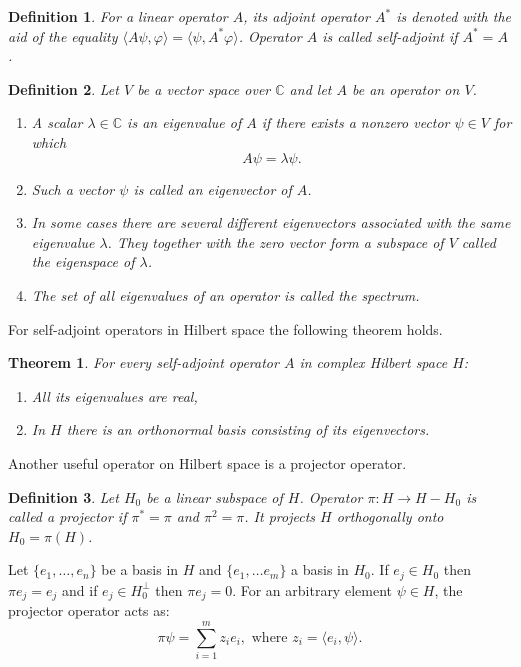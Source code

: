 \documentclass[11pt]{article}
\newtheorem{theorem}{Theorem}[section]
\newtheorem{definition}{Definition}[section]
\begin{document}
\begin{definition}
For a linear operator $A$, its adjoint operator $A^*$ is denoted with the aid of the equality $\langle A\psi,\varphi\rangle = \langle\psi, A^*\varphi\rangle$. Operator $A$ is called self-adjoint if $A^* = A$.
\end{definition}

\begin{definition}
Let $V$ be a vector space over $\mathbb{C}$ and let $A$ be an operator on $V$.
\begin{enumerate}
\item A scalar $\lambda\in \mathbb{C}$ is an eigenvalue of $A$ if there exists a nonzero vector $\psi\in V$ for which
\[
A\psi = \lambda\psi.
\]
\item Such a vector $\psi$ is called an eigenvector of $A$.
\item In some cases there are several different eigenvectors associated with the same eigenvalue $\lambda$. They together with the zero vector form a subspace of $V$ called the eigenspace of $\lambda$.
\item The set of all eigenvalues of an operator is called the spectrum.
\end{enumerate}
\end{definition}

For self-adjoint operators in Hilbert space the following theorem holds.
\begin{theorem}
For every self-adjoint operator $A$ in complex Hilbert space $H$:
\begin{enumerate}
\item All its eigenvalues are real,
\item In $H$ there is an orthonormal basis consisting of its eigenvectors.
\end{enumerate}
\end{theorem}

Another useful operator on Hilbert space is a projector operator.
\begin{definition}
Let $H_0$ be a linear subspace of $H$. Operator $\pi: H \to H - H_0$ is called a projector if $\pi^* = \pi$ and $\pi^2 = \pi$. It projects $H$ orthogonally onto $H_0 = \pi(H)$.
\end{definition}
Let $\{e_1, \ldots, e_n\}$ be a basis in $H$ and $\{e_1, \ldots e_m\}$ a basis in $H_0$. If $e_j \in H_0$ then $\pi e_j = e_j$ and if $e_j\in H_0^\perp$ then $\pi e_j = 0$. For an arbitrary element $\psi\in H$, the projector operator acts as: 
\[
\pi\psi = \sum_{i = 1}^m z_ie_i, \mbox{ where } z_i = \langle e_i, \psi\rangle.
\]
\end{document}
